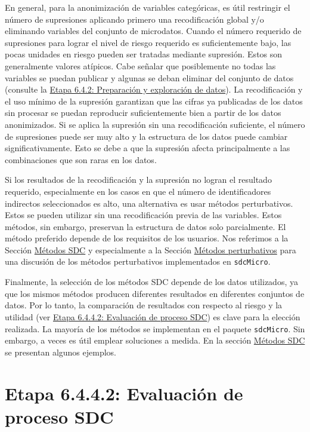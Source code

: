 \documentclass[
]{book}
\theoremstyle{definition}
\theoremstyle{definition}
\theoremstyle{definition}
\theoremstyle{definition}
\theoremstyle{remark}
\begin{document}
En general, para la anonimización de variables categóricas, es útil restringir el número de supresiones aplicando primero una recodificación global y/o eliminando variables del conjunto de microdatos. Cuando el número requerido de supresiones para lograr el nivel de riesgo requerido es suficientemente bajo, las pocas unidades en riesgo pueden ser tratadas mediante supresión. Estos son generalmente valores atípicos. Cabe señalar que posiblemente no todas las variables se puedan publicar y algunas se deban eliminar del conjunto de datos (consulte la \protect\hyperlink{etapa-6.4.2-preparaciuxf3n-y-exploraciuxf3n-de-datos}{Etapa 6.4.2: Preparación y exploración de datos}). La recodificación y el uso mínimo de la supresión garantizan que las cifras ya publicadas de los datos sin procesar se puedan reproducir suficientemente bien a partir de los datos anonimizados. Si se aplica la supresión sin una recodificación suficiente, el número de supresiones puede ser muy alto y la estructura de los datos puede cambiar significativamente. Esto se debe a que la supresión afecta principalmente a las combinaciones que son raras en los datos.

Si los resultados de la recodificación y la supresión no logran el resultado requerido, especialmente en los casos en que el número de identificadores indirectos seleccionados es alto, una alternativa es usar métodos perturbativos. Estos se pueden utilizar sin una recodificación previa de las variables. Estos métodos, sin embargo, preservan la estructura de datos solo parcialmente. El método preferido depende de los requisitos de los usuarios. Nos referimos a la Sección \protect\hyperlink{muxe9todos-sdc}{Métodos SDC} y especialmente a la Sección \protect\hyperlink{muxe9todos-perturbativos}{Métodos perturbativos} para una discusión de los métodos perturbativos implementados en \texttt{sdcMicro}.

Finalmente, la selección de los métodos SDC depende de los datos utilizados, ya que los mismos métodos producen diferentes resultados en diferentes conjuntos de datos. Por lo tanto, la comparación de resultados con respecto al riesgo y la utilidad (ver \protect\hyperlink{etapa-6.4.4.2-evaluaciuxf3n-de-proceso-sdc}{Etapa 6.4.4.2: Evaluación de proceso SDC}) es clave para la elección realizada. La mayoría de los métodos se implementan en el paquete \texttt{sdcMicro}. Sin embargo, a veces es útil emplear soluciones a medida. En la sección \protect\hyperlink{muxe9todos-sdc}{Métodos SDC} se presentan algunos ejemplos.

\hypertarget{etapa-6.4.4.2-evaluaciuxf3n-de-proceso-sdc}{%
\section{Etapa 6.4.4.2: Evaluación de proceso SDC}\label{etapa-6.4.4.2-evaluaciuxf3n-de-proceso-sdc}}
\end{document}
